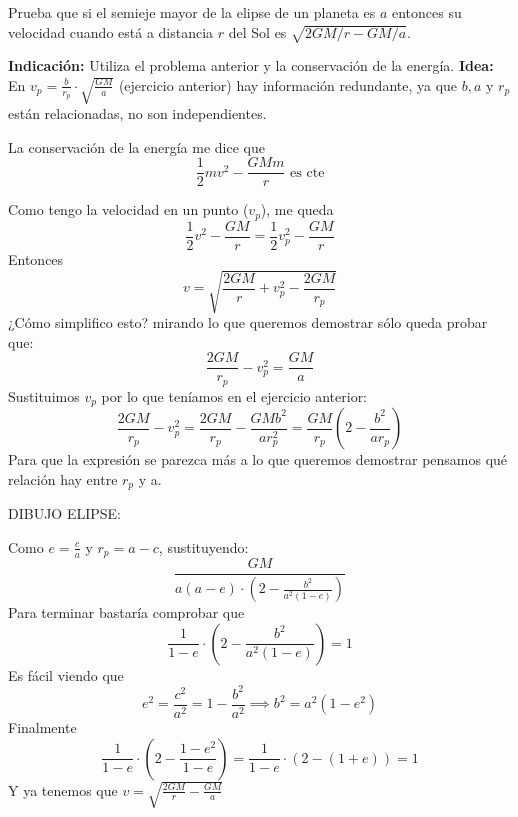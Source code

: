\begin{problem}[6]
Prueba que si el semieje mayor de la elipse de un planeta es $a$ entonces su velocidad cuando está a distancia $r$ del Sol es $\sqrt{2GM/r-GM/a}$.

\textbf{Indicación:} Utiliza el problema anterior y la conservación de la energía.
\solution
\textbf{Idea:} En $v_p = \frac{b}{r_p}\cdot \sqrt{\frac{GM}{a}}$ (ejercicio anterior) hay información redundante, ya que $b,a\text{ y } r_p$ están relacionadas, no son independientes.

La conservación de la energía me dice que
$$\frac{1}{2}m v^2 - \frac{GMm}{r} \text{ es cte}$$

Como tengo la velocidad en un punto ($v_p$), me queda
$$\frac{1}{2} v^2 - \frac{GM}{r} = \frac{1}{2} v_p^2 - \frac{GM}{r}$$
Entonces
$$v = \sqrt{\frac{2GM}{r} + v_p^2 - \frac{2GM}{r_p}}$$
¿Cómo simplifico esto? mirando lo que queremos demostrar sólo queda probar que:
$$\frac{2GM}{r_p} - v_p^2 = \frac{GM}{a}$$
Sustituimos $v_p$ por lo que teníamos en el ejercicio anterior:
$$\frac{2GM}{r_p} - v_p^2 =\frac{2GM}{r_p} -\frac{GMb^2}{ar_p^2} = \frac{GM}{r_p}(2-\frac{b^2}{a r_p}) $$
Para que la expresión se parezca más a lo que queremos demostrar pensamos qué relación hay entre $r_p$ y a.


DIBUJO ELIPSE:


Como $e = \frac{c}{a}$ y $r_p = a-c$, sustituyendo:$$\frac{GM}{a(a-e) \cdot (2-\frac{b^2}{a^2(1 - e)})}$$
Para terminar bastaría comprobar que
$$\frac{1}{1-e} \cdot (2- \frac{b^2}{a^2(1-e)}) = 1$$
Es fácil viendo que
$$e^2 = \frac{c^2}{a^2} = 1-\frac{b^2}{a^2} \implies b^2 = a^2(1-e^2)$$
Finalmente
$$\frac{1}{1-e} \cdot (2 - \frac{1 - e^2}{1 - e}) = \frac{1}{1-e} \cdot (2-(1 + e)) = 1$$
Y ya tenemos que $v=\sqrt{\frac{2GM}{r}- \frac{GM}{a}}$
\end{problem}

